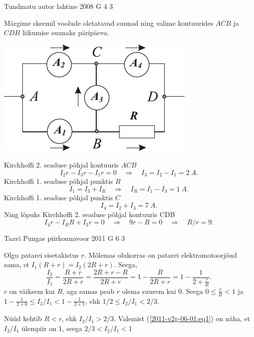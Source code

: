\documentclass[11pt]{article}
\begin{document}
{%
{Tundmatu autor} %
{lahtine} %
{2008} %
{G 4} %
{3} %
{

\ifSolution
Märgime skeemil voolude oletatavad suunad ning valime kontuurides $ACB$ ja $CDB$
liikumise suunaks päripäeva.

\begin{center}
	\includegraphics[width=0.6\linewidth]{2008-lahg-04-lah}
\end{center}

Kirchhoffi 2. seaduse põhjal kontuuris $ACB$
\[
I_2r - I_3r - I_1r = 0 \quad\Rightarrow\quad I_3 = I_2 - I_1 = \SI{2}{A}.
\]
Kirchhoffi 1. seaduse põhjal punktis $B$
\[
I_1 = I_3 + I_R \quad\Rightarrow\quad I_R = I_1 - I_3 = \SI{1}{A}.
\]
Kirchhoffi 1. seaduse põhjal punktis $C$
\[
I_4 = I_2 + I_3 = \SI{7}{A}.
\]
Ning lõpuks Kirchhoffi 2. seaduse põhjal kontuuris CDB
\[
I_4r - I_RR + I_3r = 0 \quad\Rightarrow\quad 9r - R = 0 \quad\Rightarrow\quad R/r = \num{9}.
\]
\fi
}

{Taavi Pungas} %
{piirkonnavoor} %
{2011} %
{G 6} %
{3} %
{

\ifSolution
Olgu patarei sisetakistus $r$. Mõlemas olukorras on patarei elektromotoorjõud sama, st $I_1(R + r) = I_2(2R + r)$. Seega,
\begin{equation}\label{2011-v2g-06-01:eq1}
\frac{I_2}{I_1} = \frac{R + r}{2R + r} = \frac{2R + r - R}{2R + r} = 1 - \frac{R}{2R + r} = 1 - \frac{1}{2 + \frac{r}{R}}.
\end{equation}
\osa $r$ on väiksem kui $R$, aga samas peab $r$ olema suurem kui \num{0}. Seega $0 \leq \frac{r}{R} < 1$ ja $1 - \frac{1}{2 + 0} \leq I_2/I_1 < 1 - \frac{1}{2 + 1}$, ehk $1 / 2 \leq I_{2} / I_{1}<2 / 3$.

\osa Nüüd kehtib $R < r$, ehk $I_2/I_1 > 2/3$. Valemist (\ref{2011-v2g-06-01:eq1}) on näha, et $I_2/I_1$ ülempiir on \num{1}, seega $2/3 < I_2/I_1 < 1$
\fi
}

}
\end{document}
